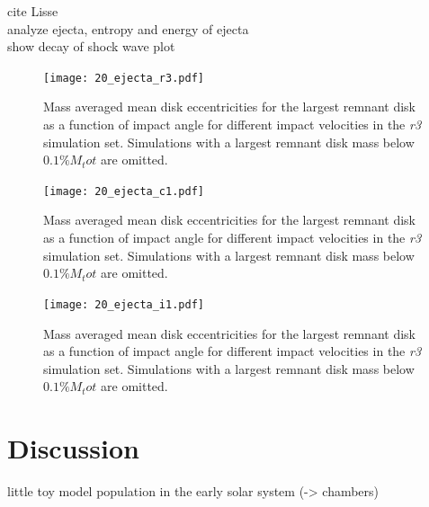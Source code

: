 cite Lisse\\
analyze ejecta, entropy and energy of ejecta \\
show decay of shock wave plot\\ %

\begin{landscape}
\begin{figure}
\begin{center}
\texttt{[image: 20\_ejecta\_r3.pdf]}
\caption{Mass averaged mean disk eccentricities for the largest remnant disk as a function of impact angle for different impact velocities in the \emph{r3} simulation set. Simulations with a largest remnant disk mass below $0.1\% M_tot$ are omitted.}
\label{ch03_fig20a}
\end{center}
\end{figure}

\begin{figure}
\begin{center}
\texttt{[image: 20\_ejecta\_c1.pdf]}
\caption{Mass averaged mean disk eccentricities for the largest remnant disk as a function of impact angle for different impact velocities in the \emph{r3} simulation set. Simulations with a largest remnant disk mass below $0.1\% M_tot$ are omitted.}
\label{ch03_fig20b}
\end{center}
\end{figure}

\begin{figure}
\begin{center}
\texttt{[image: 20\_ejecta\_i1.pdf]}
\caption{Mass averaged mean disk eccentricities for the largest remnant disk as a function of impact angle for different impact velocities in the \emph{r3} simulation set. Simulations with a largest remnant disk mass below $0.1\% M_tot$ are omitted.}
\label{ch03_fig20c}
\end{center}
\end{figure}
\end{landscape}



\section{Discussion}
little toy model population in the early solar system (-> chambers) \\

